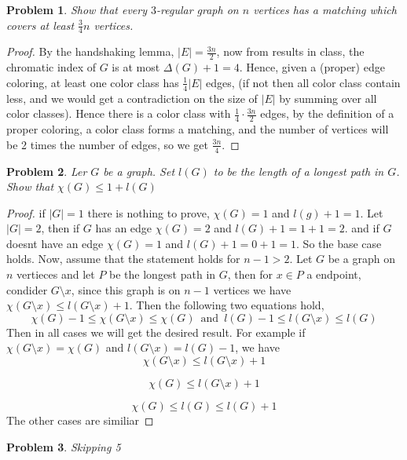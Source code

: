 \documentclass{article}
\newtheorem{prb}{Problem}
\begin{document}
	   \begin{prb}
		   Show that every $3$-regular graph on $n$ vertices has a matching which covers at least $ \frac{3}{4}n $ vertices. 
	   \end{prb} 

	   \begin{proof}
	   	By the handshaking lemma, $|E| = \frac{3n}{2} $, now from results in class, the chromatic index of $G$ is at most $\Delta(G) + 1 = 4$. 
		Hence, given a (proper) edge coloring, at least one color class has $ \frac{1}{4} |E|$ edges, (if not then all color class contain less, 
		and we would get a contradiction on the size of $|E|$ by summing over all color classes). Hence there is a color class with 
		$ \frac{1}{4} \cdot \frac{3n}{2} $ edges, by the definition of a proper coloring, a color class forms a matching, and the number 
		of vertices will be 2 times the number of edges, so we get $ \frac{3n}{4} $. 
	   \end{proof}

	   \begin{prb}
	   	Ler $G$ be a graph. Set $l(G)$ to be the length of a longest path in $G$. Show that $\chi(G) \leq 1 + l(G)$
	   \end{prb}

	   \begin{proof}
		if $|G| = 1$ there is nothing to prove, $\chi(G) = 1$ and $l(g) + 1 = 1$. 
	   	Let $|G| = 2$, then if $G$ has an edge $\chi(G) = 2$ and $l(G) + 1 = 1 + 1 = 2$. and if $G$ doesnt have an edge $\chi(G) = 1$ and 
		$l(G) + 1 = 0 + 1 = 1$. So the base case holds. Now, assume that the statement holds for $n-1 > 2$. Let $G$ be a graph on $n$ vertieces and let $P$ be the longest path in $G$, 
		then for $x \in P$ a endpoint, condider $G \setminus x$, since this graph is on $n - 1$ vertices we have $\chi(G \setminus x) 
		\leq l(G \setminus x) + 1$. Then the following two equations hold, 
		\begin{equation}
			\chi(G) -1 \leq \chi(G\setminus x) \leq \chi(G) \, \text{ and } \, l(G) - 1 \leq l(G \setminus x) \leq l(G)
		\end{equation}
Then in all cases we will get  the desired result. For example if $\chi(G \setminus x) = \chi(G) $ and $l(G \setminus x) = l(G)-1$, we have
		\[
		  \chi(G \setminus x) \leq l(G \setminus x) + 1	
		\]

		\[
			\chi(G) \leq l(G \setminus x) + 1
		\]

		\[
			\chi(G) \leq l(G) \leq l(G) + 1
		\] 
		The other cases are similiar 
	   \end{proof}
\begin{prb}
	Skipping 5
\end{prb}
\end{document}
